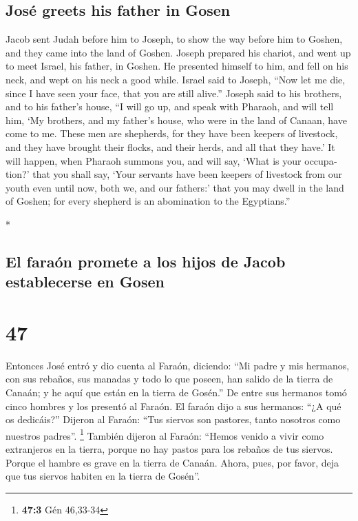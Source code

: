 \begin{paracol}{2}
\begin{otherlanguage}{english}
{\subsection{José greets his father in
Gosen}\label{josuxe9-greets-his-father-in-gosen}}

 Jacob sent Judah before him to Joseph, to show the way
before him to Goshen, and they came into the land of Goshen.
 Joseph prepared his chariot, and went up to meet Israel,
his father, in Goshen. He presented himself to him, and fell on his
neck, and wept on his neck a good while.  Israel said to
Joseph, ``Now let me die, since I have seen your face, that you are
still alive.''  Joseph said to his brothers, and to his
father's house, ``I will go up, and speak with Pharaoh, and will tell
him, `My brothers, and my father's house, who were in the land of
Canaan, have come to me.  These men are shepherds, for
they have been keepers of livestock, and they have brought their flocks,
and their herds, and all that they have.'  It will
happen, when Pharaoh summons you, and will say, `What is your
occupation?'  that you shall say, `Your servants have
been keepers of livestock from our youth even until now, both we, and
our fathers:' that you may dwell in the land of Goshen; for every
shepherd is an abomination to the Egyptians.''

\end{otherlanguage}

\switchcolumn[0]*

\hypertarget{el-farauxf3n-promete-a-los-hijos-de-jacob-establecerse-en-gosen}{%
\subsection{El faraón promete a los hijos de Jacob establecerse en
Gosen}\label{el-farauxf3n-promete-a-los-hijos-de-jacob-establecerse-en-gosen}}

\hypertarget{section-92}{%
\section{47}\label{section-92}}

 Entonces José entró y dio cuenta al Faraón, diciendo:
``Mi padre y mis hermanos, con sus rebaños, sus manadas y todo lo que
poseen, han salido de la tierra de Canaán; y he aquí que están en la
tierra de Gosén.''  De entre sus hermanos tomó cinco
hombres y los presentó al Faraón.  El faraón dijo a sus
hermanos: ``¿A qué os dedicáis?'' Dijeron al Faraón: ``Tus siervos son
pastores, tanto nosotros como nuestros padres''. \footnote{\textbf{47:3}
  Gén 46,33-34}  También dijeron al Faraón: ``Hemos venido
a vivir como extranjeros en la tierra, porque no hay pastos para los
rebaños de tus siervos. Porque el hambre es grave en la tierra de
Canaán. Ahora, pues, por favor, deja que tus siervos habiten en la
tierra de Gosén''.


\end{paracol}

